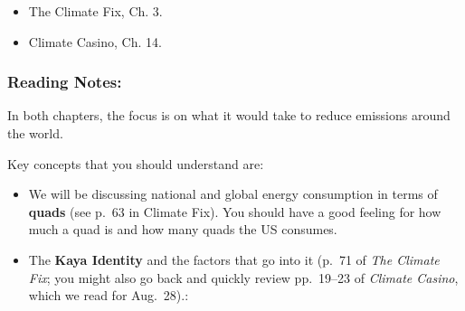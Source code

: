 \documentclass[
]{article}
\providecommand{\tightlist}{%
  \setlength{\itemsep}{0pt}\setlength{\parskip}{0pt}}
\newcommand{\COO}{\ce{CO2}}
\begin{document}
\begin{itemize}
\tightlist
\item
  The Climate Fix, Ch. 3.
\item
  Climate Casino, Ch. 14.
\end{itemize}

\hypertarget{reading-notes-18}{%
\subsubsection{Reading Notes:}\label{reading-notes-18}}

In both chapters, the focus is on what it would take to reduce \COO{}
emissions around the world.

Key concepts that you should understand are:

\begin{itemize}
\item
  We will be discussing national and global energy consumption in terms
  of \textbf{quads} (see p.~63 in Climate Fix). You should have a good
  feeling for how much a quad is and how many quads the US consumes.
\item
  The \textbf{Kaya Identity} and the factors that go into it (p.~71 of
  \emph{The Climate Fix}; you might also go back and quickly review
  pp.~19--23 of \emph{Climate Casino}, which we read for Aug.~28).:


\end{itemize}
\end{document}
